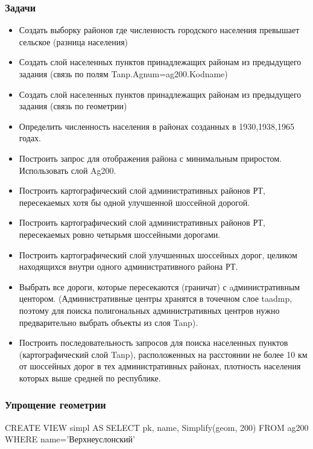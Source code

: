 
\begin{frame}[allowframebreaks]
    \frametitle{Задачи}
    \begin{itemize}
        \item Создать выборку районов где численность городского населения превышает сельское (разница населения)
        \item Создать слой населенных пунктов принадлежащих районам из предыдущего задания (связь по полям Tanp.Agnum=ag200.Kodname)
        \item Создать слой населенных пунктов принадлежащих районам из предыдущего задания (связь по геометрии)
        \item Определить численность населения в районах созданных в 1930,1938,1965 годах.
        \item Построить запрос для отображения района с минимальным приростом. Использовать слой Ag200.
        \item Построить картографический слой административных районов РТ, пересекаемых хотя бы одной улучшенной шоссейной дорогой.
        \item Построить картографический слой административных районов РТ, пересекаемых ровно четырьмя шоссейными дорогами.
        \item Построить картографический слой улучшенных шоссейных дорог, целиком находящихся внутри одного административного района РТ.
        \item Выбрать все дороги, которые пересекаются (граничат) с aдминистративным центором. (Административные центры хранятся в точечном слое taadmp, поэтому для поиска полигональных административных центров нужно предварительно выбрать объекты из слоя Tanp).
        \item Построить последовательность запросов для поиска населенных пунктов (картографический слой Tanp), расположенных на расстоянии не более 10 км от шоссейных дорог в тех административных районах, плотность населения которых выше средней по республике.
    \end{itemize}
\end{frame}

\begin{frame}
    \frametitle{Упрощение геометрии}
    CREATE VIEW simpl AS SELECT pk, name, Simplify(geom, 200) FROM ag200 WHERE name='Верхнеуслонский'
\end{frame}
